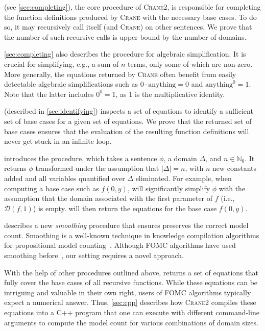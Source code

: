 \documentclass[a4paper,UKenglish,cleveref,autoref]{lipics-v2021}
\newcommand{\Cranetwo}{\textsc{Crane2}}
\begin{document}
\CompileWithBaseCases (see \cref{sec:completing}), the core procedure of
\Cranetwo{}, is responsible for completing the function definitions produced by
\textsc{Crane} with the necessary base cases. To do so, it may recursively call
itself (and \textsc{Crane}) on other sentences. We prove that the number of such
recursive calls is upper bound by the number of domains.

\cref{sec:completing} also describes the \Simplify procedure for algebraic
simplification. It is crucial for simplifying, e.g., a sum of $n$ terms, only
some of which are non-zero. More generally, the equations returned by
\textsc{Crane} often benefit from easily detectable algebraic simplifications
such as $0 \cdot \text{anything} = 0$ and $\text{anything}^{0} = 1$. Note that
the latter includes $0^{0} = 1$, as 1 is the multiplicative identity.

\FindBaseCases (described in \cref{sec:identifying}) inspects a set of equations
to identify a sufficient set of base cases for a given set of equations. We
prove that the returned set of base cases ensures that the evaluation of the
resulting function definitions will never get stuck in an infinite loop.

 introduces the \Propagate procedure, which takes a
sentence $\phi$, a domain $\Delta$, and $n \in \mathbb{N}_{0}$. It returns
$\phi$ transformed under the assumption that $|\Delta| = n$, with $n$ new
constants added and all variables quantified over $\Delta$ eliminated. For
example, when computing a base case such as $f(0, y)$, \Propagate will
significantly simplify $\phi$ with the assumption that the domain associated
with the first parameter of $f$ (i.e., $\mathcal{D}(f, 1)$) is empty.
 will then
return the equations for the base case $f(0, y)$.

 describes a new \emph{smoothing} procedure that ensures
\Propagate preserves the correct model count. Smoothing is a well-known
technique in knowledge compilation algorithms for propositional model
counting~\cite{darwiche2001tractable}. Although FOMC algorithms have used
smoothing before~\cite{DBLP:conf/ijcai/BroeckTMDR11}, our setting requires a
novel approach.

With the help of other procedures outlined above, \CompileWithBaseCases returns
a set of equations that fully cover the base cases of all recursive functions.
While these equations can be intriguing and valuable in their own right, users
of FOMC algorithms typically expect a numerical answer. Thus, \cref{sec:cpp}
describes how \Cranetwo{} compiles these equations into a C++ program that one
can execute with different command-line arguments to compute the model count for
various combinations of domain sizes.
\end{document}
